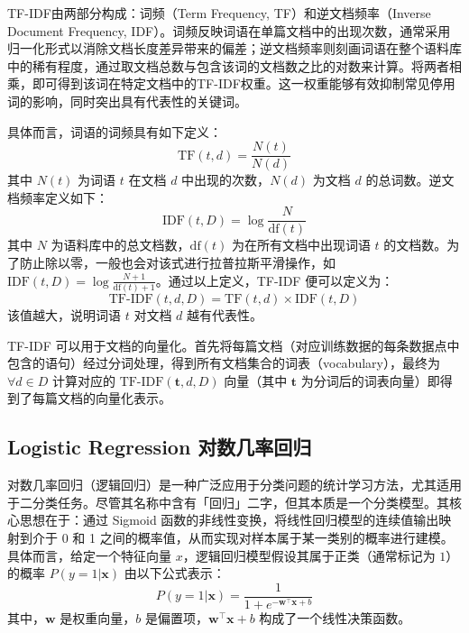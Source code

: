 \documentclass[12pt, a4paper, UTF8]{ctexart}
\begin{document}
TF-IDF由两部分构成：词频（Term Frequency, TF）和逆文档频率（Inverse Document Frequency, IDF）。词频反映词语在单篇文档中的出现次数，通常采用归一化形式以消除文档长度差异带来的偏差；逆文档频率则刻画词语在整个语料库中的稀有程度，通过取文档总数与包含该词的文档数之比的对数来计算。将两者相乘，即可得到该词在特定文档中的TF-IDF权重。这一权重能够有效抑制常见停用词的影响，同时突出具有代表性的关键词。

具体而言，词语的词频具有如下定义：
$$
\mathrm{TF}(t, d) = \frac{N(t)}{N(d)}
$$
其中 $N(t)$ 为词语 $t$ 在文档 $d$ 中出现的次数，$N(d)$ 为文档 $d$ 的总词数。逆文档频率定义如下：
$$
\mathrm{IDF}(t,D) = \log \frac{N}{\mathrm{df}(t)}
$$
其中 $N$ 为语料库中的总文档数，$\mathrm{df}(t)$ 为在所有文档中出现词语 $t$ 的文档数。为了防止除以零，一般也会对该式进行拉普拉斯平滑操作，如 $\mathrm{IDF}(t,D)=\log \frac{N+1}{\mathrm{df}(t)+1}$。通过以上定义，TF-IDF 便可以定义为：
$$
\text{TF-IDF}(t, d, D) = \mathrm{TF}(t, d) \times \mathrm{IDF}(t, D)
$$
该值越大，说明词语 $t$ 对文档 $d$ 越有代表性。



TF-IDF 可以用于文档的向量化。首先将每篇文档（对应训练数据的每条数据点中包含的语句）经过分词处理，得到所有文档集合的词表（vocabulary），最终为 $\forall d\in D$ 计算对应的 $\text{TF-IDF}(\boldsymbol{t}, d, D)$ 向量（其中 $\boldsymbol{t}$ 为分词后的词表向量）即得到了每篇文档的向量化表示。



\subsection{Logistic Regression 对数几率回归}
对数几率回归（逻辑回归）是一种广泛应用于分类问题的统计学习方法，尤其适用于二分类任务。尽管其名称中含有「回归」二字，但其本质是一个分类模型。其核心思想在于：通过 Sigmoid 函数的非线性变换，将线性回归模型的连续值输出映射到介于 0 和 1 之间的概率值，从而实现对样本属于某一类别的概率进行建模。具体而言，给定一个特征向量 $x$，逻辑回归模型假设其属于正类（通常标记为 $1$）的概率 $P(y=1|\boldsymbol{x})$ 由以下公式表示：
$$P(y=1|\boldsymbol{x}) = \frac{1}{1+e^{-\boldsymbol{w}^{\top}\boldsymbol{x} + b}}$$
其中，$\boldsymbol{w}$ 是权重向量，$b$ 是偏置项，$\boldsymbol{w}^{\top}\boldsymbol{x}+b$ 构成了一个线性决策函数。
\end{document}
